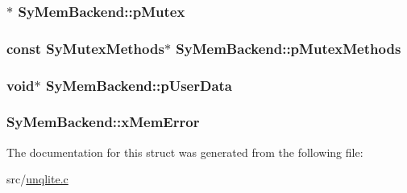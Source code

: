 \hypertarget{struct_sy_mem_backend_a6d143e0f60592c36ee983b6da929c59f}{
\subsubsection[{p\-Mutex}]{$\ast$ Sy\-Mem\-Backend\-::p\-Mutex}}\label{d0/dc7/struct_sy_mem_backend_a6d143e0f60592c36ee983b6da929c59f}
\hypertarget{struct_sy_mem_backend_a70af172f4ec527d7a28c5b6b434875b6}{
\subsubsection[{p\-Mutex\-Methods}]{\setlength{\rightskip}{0pt plus 5cm}const {\bf Sy\-Mutex\-Methods}$\ast$ Sy\-Mem\-Backend\-::p\-Mutex\-Methods}}\label{d0/dc7/struct_sy_mem_backend_a70af172f4ec527d7a28c5b6b434875b6}
\hypertarget{struct_sy_mem_backend_a472e3fc25df43d13f8d225e2baa88be5}{
\subsubsection[{p\-User\-Data}]{\setlength{\rightskip}{0pt plus 5cm}void$\ast$ Sy\-Mem\-Backend\-::p\-User\-Data}}\label{d0/dc7/struct_sy_mem_backend_a472e3fc25df43d13f8d225e2baa88be5}
\hypertarget{struct_sy_mem_backend_a7c71631377efe316cf49e40176166aba}{
\subsubsection[{x\-Mem\-Error}]{ Sy\-Mem\-Backend\-::x\-Mem\-Error}}\label{d0/dc7/struct_sy_mem_backend_a7c71631377efe316cf49e40176166aba}


The documentation for this struct was generated from the following file\-:\begin{DoxyCompactItemize}
\item 
src/\hyperlink{unqlite_8c}{unqlite.\-c}\end{DoxyCompactItemize}
